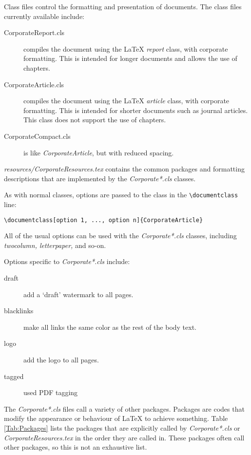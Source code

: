 Class files control the formatting and presentation of documents. The class files currently available include:
\begin{description}
\item[CorporateReport.cls]{compiles the document using the LaTeX \emph{report} class, with corporate formatting. This is intended for longer documents and allows the use of chapters.}
\item[CorporateArticle.cls] compiles the document using the LaTeX \emph{article} class, with corporate formatting. This is intended for shorter documents such as journal articles. This class does not support the use of chapters.
\item[CorporateCompact.cls] is like \emph{CorporateArticle}, but with reduced spacing.
\end{description}

\emph{resources/CorporateResources.tex} contains the common packages and formatting descriptions that are implemented by the \emph{Corporate*.cls} classes.

As with normal classes, options are passed to the class in the \verb+\documentclass+ line:

\begin{lstlisting}
\documentclass[option 1, ..., option n]{CorporateArticle}
\end{lstlisting}

All of the usual options can be used with the \emph{Corporate*.cls} classes, including \emph{twocolumn, letterpaper,} and so-on.

Options specific to \emph{Corporate*.cls} include:
\begin{description}
\item[draft]{add a `draft' watermark to all pages.}
\item[blacklinks]{make all links the same color as the rest of the body text.}
\item[logo]{add the logo to all pages.}
\item[tagged]{used PDF tagging}
\end{description}

The \emph{Corporate*.cls} files call a variety of other packages. Packages are codes that modify the appearance or behaviour of LaTeX to achieve something. Table \ref{Tab:Packages} lists the packages that are explicitly called by \emph{Corporate*.cls} or \emph{CorporateResources.tex} in the order they are called in. These packages often call other packages, so this is not an exhaustive list.

